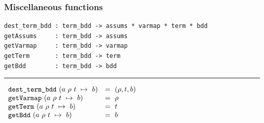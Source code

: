 \documentclass[12pt,fleqn]{book}
\renewcommand{\t}[1]{\mbox{\tt #1}}
\newcommand{\termbdd}[4]{\mbox{$#1~#2~#3~\mapsto~#4$}}
\begin{document}
\subsubsection{Miscellaneous functions}\label{misc}


\noindent \newsavebox\destructors
\begin{lrbox}\destructors
\begin{minipage}{\minipagewidth}

\begin{footnotesize}
\begin{verbatim}
dest_term_bdd : term_bdd -> assums * varmap * term * bdd
getAssums     : term_bdd -> assums
getVarmap     : term_bdd -> varmap
getTerm       : term_bdd -> term
getBdd        : term_bdd -> bdd
\end{verbatim}
\end{footnotesize}
\vspace*{-6mm}

\noindent \rule\minipagewidth{0.1pt}

\vspace*{1mm}

\begin{footnotesize}
\hspace*{-1.5mm}$\begin{array}{ll}
\t{dest\_term\_bdd}~(\termbdd{a}{\rho}{t}{b})&=~(\rho, t, b)\\
\t{getVarmap}~(\termbdd{a}{\rho}{t}{b})&=~\rho\\
\t{getTerm}~(\termbdd{a}{\rho}{t}{b})&=~t\\
\t{getBdd}~(\termbdd{a}{\rho}{t}{b})&=~b
\end{array}$
\end{footnotesize}
\end{minipage}
\end{lrbox}
\fbox{\usebox{\destructors}}

\bigskip

\noindent \newsavebox\inSupport
{}
\fbox{\usebox{\inSupport}}
\end{document}
